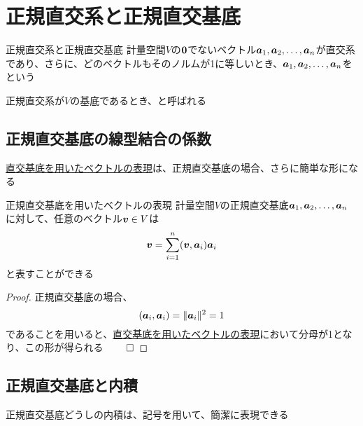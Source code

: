 \documentclass[../../../topic_linear-algebra]{subfiles}
\begin{document}
\sectionline
\section{正規直交系と正規直交基底}

\begin{definition}{正規直交系と正規直交基底}
  計量空間$V$の$\vb*{0}$でないベクトル$\vb*{a}_1, \vb*{a}_2, \ldots, \vb*{a}_n$が直交系であり、さらに、どのベクトルもそのノルムが1に等しいとき、$\vb*{a}_1, \vb*{a}_2, \ldots, \vb*{a}_n$をという

  正規直交系が$V$の基底であるとき、と呼ばれる
\end{definition}

\subsection{正規直交基底の線型結合の係数}

\hyperref[thm:vector-expansion-by-orthogonal-basis]{直交基底を用いたベクトルの表現}は、正規直交基底の場合、さらに簡単な形になる

\begin{theorem}{正規直交基底を用いたベクトルの表現}\label{thm:expansion-in-orthonormal-basis}
  計量空間$V$の正規直交基底$\vb*{a}_1, \vb*{a}_2, \ldots, \vb*{a}_n$に対して、任意のベクトル$\vb*{v} \in V$は
  \begin{equation*}
    \vb*{v} = \sum_{i=1}^n (\vb*{v}, \vb*{a}_i) \vb*{a}_i
  \end{equation*}
  と表すことができる
\end{theorem}

\begin{proof}
  正規直交基底の場合、
  \begin{equation*}
    (\vb*{a}_i,\vb*{a}_i) = \|\vb*{a}_i\|^2 = 1
  \end{equation*}
  であることを用いると、\hyperref[thm:vector-expansion-by-orthogonal-basis]{直交基底を用いたベクトルの表現}において分母が1となり、この形が得られる $\qed$
\end{proof}

\subsection{正規直交基底と内積}

正規直交基底どうしの内積は、記号を用いて、簡潔に表現できる
\end{document}
